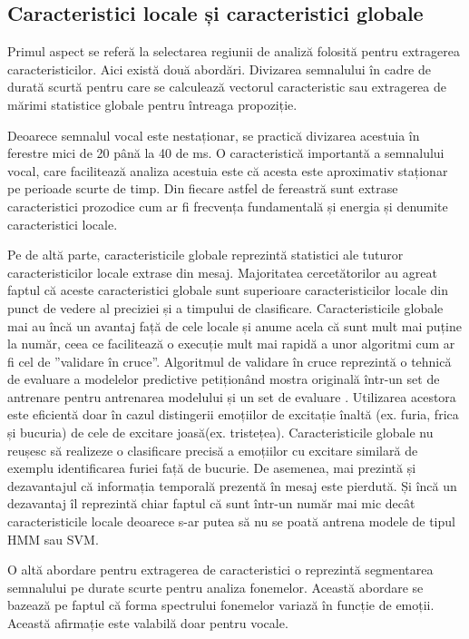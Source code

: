 \documentclass[9pt,shortpaper,twoside,web]{ieeecolor}
\begin{document}
\subsection{Caracteristici locale și caracteristici globale}
Primul aspect se referă la selectarea regiunii de analiză folosită pentru extragerea caracteristicilor. Aici există două abordări. Divizarea semnalului în cadre de durată scurtă pentru care se calculează vectorul caracteristic sau extragerea de mărimi statistice globale pentru întreaga propoziție. 

Deoarece semnalul vocal este nestaționar, se practică divizarea acestuia în ferestre mici de 20 până la 40 de ms. O caracteristică importantă a semnalului vocal, care facilitează analiza acestuia este că acesta este aproximativ staționar pe perioade scurte de timp. Din fiecare astfel de fereastră sunt extrase caracteristici prozodice cum ar fi frecvența fundamentală și energia și denumite caracteristici locale. 

Pe de altă parte, caracteristicile globale reprezintă statistici ale tuturor caracteristicilor locale extrase din mesaj. Majoritatea cercetătorilor au agreat faptul că aceste caracteristici globale sunt superioare caracteristicilor locale din punct de vedere al preciziei și a timpului de clasificare. Caracteristicile globale mai au încă un avantaj față de cele locale și anume acela că sunt mult mai puține la număr, ceea ce facilitează o execuție mult mai rapidă a unor algoritmi cum ar fi cel de ”validare în cruce”. Algoritmul de validare în cruce reprezintă o tehnică de evaluare a modelelor predictive petiționând mostra originală într-un set de antrenare pentru antrenarea modelului și un set de evaluare \cite{b2}. Utilizarea acestora este eficientă doar în cazul distingerii emoțiilor de excitație înaltă (ex. furia, frica și bucuria) de cele de excitare joasă(ex. tristețea). Caracteristicile globale nu reușesc să realizeze o clasificare precisă a emoțiilor cu excitare similară de exemplu identificarea furiei față de bucurie. De asemenea, mai prezintă și dezavantajul că informația temporală prezentă în mesaj este pierdută. Și încă un dezavantaj îl reprezintă chiar faptul că sunt într-un număr mai mic decât caracteristicile locale deoarece s-ar putea să nu se poată antrena modele de tipul HMM sau SVM.

O altă abordare pentru extragerea de caracteristici o reprezintă segmentarea semnalului pe durate scurte pentru analiza fonemelor. Această abordare se bazează pe faptul că forma spectrului fonemelor variază în funcție de emoții. Această afirmație este valabilă doar pentru vocale.
\end{document}
